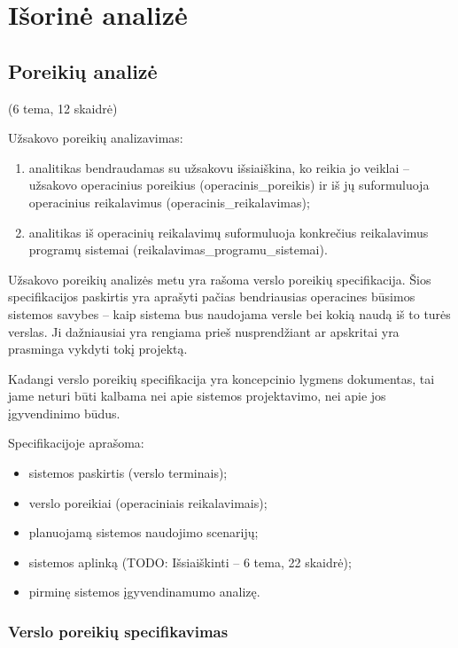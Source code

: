 \chapter{Išorinė analizė}

\section{Poreikių analizė}

\label{tema:poreikiu_analize}

(6 tema, 12 skaidrė)

Užsakovo poreikių analizavimas:
\begin{enumerate}
  \item analitikas bendraudamas su užsakovu išsiaiškina, ko reikia jo
    veiklai – užsakovo operacinius poreikius (\gls{operacinis_poreikis})
    ir iš jų suformuluoja operacinius reikalavimus 
    (\gls{operacinis_reikalavimas});
  \item analitikas iš operacinių reikalavimų suformuluoja konkrečius
    reikalavimus programų sistemai (\gls{reikalavimas_programu_sistemai}).
\end{enumerate}

Užsakovo poreikių analizės metu yra rašoma verslo poreikių specifikacija.
Šios specifikacijos paskirtis yra aprašyti pačias bendriausias operacines
būsimos sistemos savybes – kaip sistema bus naudojama versle bei kokią
naudą iš to turės verslas. Ji dažniausiai yra rengiama prieš nusprendžiant 
ar apskritai yra prasminga vykdyti tokį projektą.
\begin{note}
  Kadangi verslo poreikių specifikacija yra koncepcinio lygmens dokumentas,
  tai jame neturi būti kalbama nei apie sistemos projektavimo, nei apie
  jos įgyvendinimo būdus.
\end{note}

Specifikacijoje aprašoma:
\begin{itemize}
  \item sistemos paskirtis (verslo terminais);
  \item verslo poreikiai (operaciniais reikalavimais);
  \item planuojamą sistemos naudojimo scenarijų;
  \item sistemos aplinką (TODO: Išsiaiškinti – 6 tema, 22 skaidrė);
  \item pirminę sistemos įgyvendinamumo analizę.
\end{itemize}

\subsection{Verslo poreikių specifikavimas}

